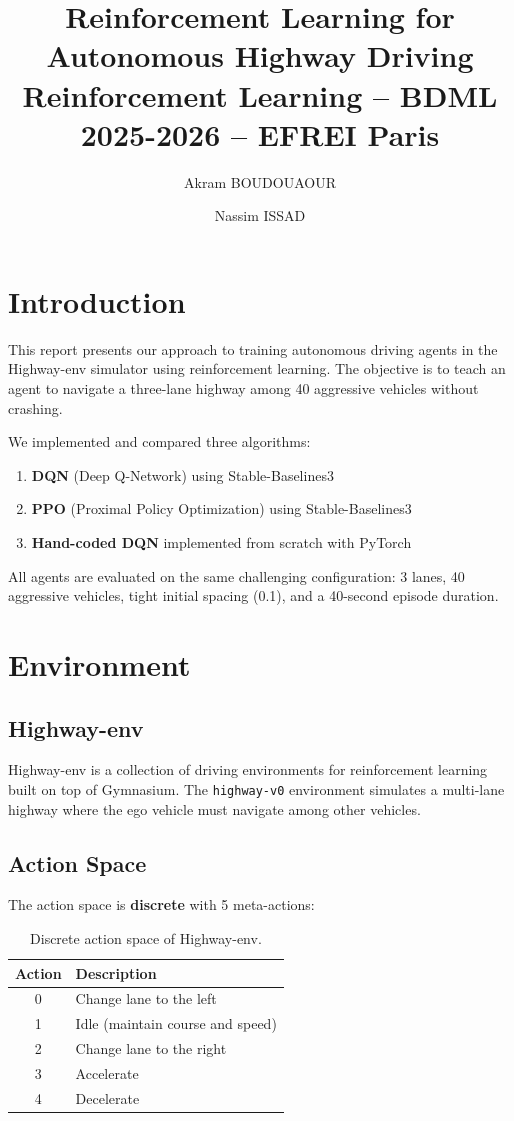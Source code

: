 \documentclass[11pt,a4paper]{article}
\title{\textbf{Reinforcement Learning for Autonomous Highway Driving}\\[0.3cm]
\large Reinforcement Learning -- BDML 2025-2026 -- EFREI Paris}
\author{Akram BOUDOUAOUR \and Nassim ISSAD}
\date{}
\begin{document}
\maketitle

\section{Introduction}

This report presents our approach to training autonomous driving agents in the Highway-env simulator using reinforcement learning. The objective is to teach an agent to navigate a three-lane highway among 40 aggressive vehicles without crashing.

We implemented and compared three algorithms:
\begin{enumerate}
    \item \textbf{DQN} (Deep Q-Network) using Stable-Baselines3
    \item \textbf{PPO} (Proximal Policy Optimization) using Stable-Baselines3
    \item \textbf{Hand-coded DQN} implemented from scratch with PyTorch
\end{enumerate}

All agents are evaluated on the same challenging configuration: 3 lanes, 40 aggressive vehicles, tight initial spacing (0.1), and a 40-second episode duration.

\section{Environment}

\subsection{Highway-env}

Highway-env \cite{leurent2018} is a collection of driving environments for reinforcement learning built on top of Gymnasium. The \texttt{highway-v0} environment simulates a multi-lane highway where the ego vehicle must navigate among other vehicles.

\subsection{Action Space}

The action space is \textbf{discrete} with 5 meta-actions:

\begin{table}[H]
\centering
\begin{tabular}{cl}
\toprule
\textbf{Action} & \textbf{Description} \\
\midrule
0 & Change lane to the left \\
1 & Idle (maintain course and speed) \\
2 & Change lane to the right \\
3 & Accelerate \\
4 & Decelerate \\
\bottomrule
\end{tabular}
\caption{Discrete action space of Highway-env.}
\end{table}
\end{document}
